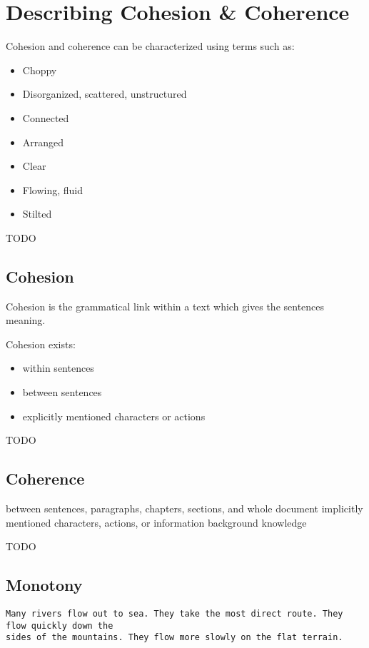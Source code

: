 \documentclass[10pt,a4paper]{book}
\begin{document}
\section{Describing Cohesion \& Coherence}

Cohesion and coherence can be characterized using terms such as:
\begin{itemize}
    \itemsep1pt\parskip0pt
    \item Choppy
    \item Disorganized, scattered, unstructured
    \item Connected
    \item Arranged
    \item Clear
    \item Flowing, fluid
    \item Stilted
\end{itemize}

\color{BrickRed}TODO\color{black}


\subsection{Cohesion}

Cohesion is the grammatical link within a text which gives the sentences meaning.

Cohesion exists:
\begin{itemize}
    \itemsep1pt\parskip0pt
    \item within sentences
    \item between sentences
    \item explicitly mentioned characters or actions
\end{itemize}

\color{BrickRed}TODO\color{black}


\subsection{Coherence}

between sentences, paragraphs, chapters, sections, and whole document
implicitly mentioned characters, actions, or information
background knowledge

\color{BrickRed}TODO\color{black}


\subsection{Monotony}

\begin{verbatim}
Many rivers flow out to sea. They take the most direct route. They flow quickly down the
sides of the mountains. They flow more slowly on the flat terrain.
\end{verbatim}
\end{document}

